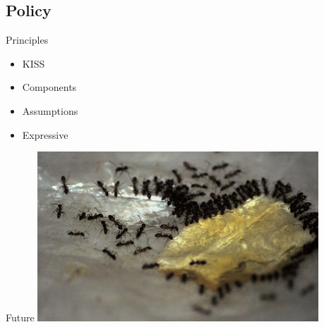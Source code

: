 \subsection{Policy}

\begin{frame}{Principles}
\begin{itemize}
\item KISS
\item Components
\item Assumptions
\item Expressive
\end{itemize}
\end{frame}

\begin{frame}{Future}
  \includegraphics{ants.jpg}
\end{frame}





